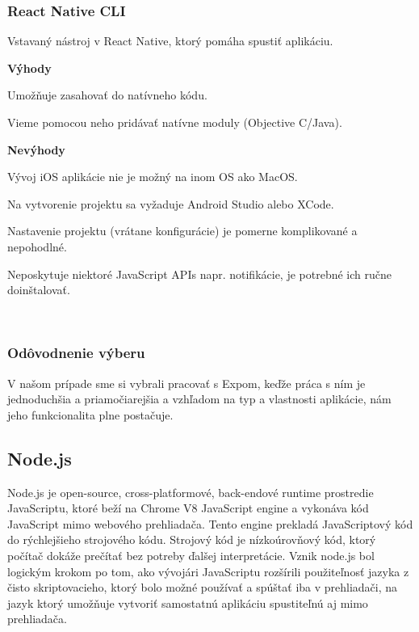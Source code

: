 \subsubsection{React Native CLI}
Vstavaný nástroj v React Native, ktorý pomáha spustiť aplikáciu. \newline

{\bf Výhody}
\begin{itemize}
{\item Umožňuje zasahovať do natívneho kódu.} 
{\item Vieme pomocou neho pridávať natívne moduly (Objective C/Java).} 
\end{itemize}

{\bf Nevýhody}
\begin{itemize}
{\item Vývoj iOS aplikácie nie je možný na inom OS ako MacOS.} 
{\item Na vytvorenie projektu sa vyžaduje Android Studio alebo XCode.}
{\item Nastavenie projektu (vrátane konfigurácie) je pomerne komplikované a nepohodlné.} 
{\item Neposkytuje niektoré JavaScript APIs napr. notifikácie, je potrebné ich ručne doinštalovať.} \\
\end{itemize}

\subsubsection{Odôvodnenie výberu}
V našom prípade sme si vybrali pracovať s Expom, keďže práca s ním je jednoduchšia a priamočiarejšia a vzhľadom na typ a vlastnosti aplikácie, nám jeho funkcionalita plne postačuje. \\

\subsection{Node.js}
Node.js je open-source, cross-platformové, back-endové runtime prostredie JavaScriptu, ktoré beží na Chrome V8 JavaScript engine a vykonáva kód JavaScript mimo webového prehliadača. Tento engine prekladá JavaScriptový kód do rýchlejšieho strojového kódu. Strojový kód je nízkoúrovňový kód, ktorý počítač dokáže prečítať bez potreby ďalšej interpretácie. Vznik node.js bol logickým krokom po tom, ako vývojári JavaScriptu rozšírili použiteľnosť jazyka z čisto skriptovacieho, ktorý bolo možné používať a spúštať iba v prehliadači, na jazyk ktorý umožňuje vytvoriť samostatnú aplikáciu spustiteľnú aj mimo prehliadača. 

